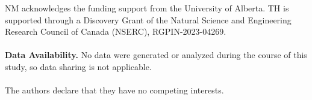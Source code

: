 \documentclass[11pt]{article}
\theoremstyle{definition}
\begin{document}
\vspace{1.3cm}
 NM acknowledges the funding support from the University of Alberta. TH is supported through a Discovery Grant of the Natural Science and Engineering Research Council of Canada (NSERC), RGPIN-2023-04269.\\
\\
\noindent
\textbf{Data Availability.} No data were generated or analyzed during the course of this study, so data sharing is not
applicable.
\\
\\
The authors declare that they have no competing interests.

\end{document}
